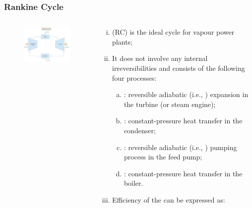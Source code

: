 \documentclass[10pt,compress,handout,unknownkeysallowed]{beamer}
\begin{document}
\begin{frame}
 \frametitle{Rankine Cycle}
 \begin{columns}
   \begin{column}[c]{0.5\linewidth}
    \begin{figure}%
     \begin{center} 
      \includegraphics[width=6.5cm,clip]{../Pics/Simple_Rankine_Cycle}
     \end{center}
    \end{figure}  
   \end{column}
   \begin{column}[l]{0.5\linewidth}
    \begin{enumerate}[i)]\scriptsize
     \item<1-> (RC) is the ideal cycle for vapour power plants;
     \item<2-> It does not involve any internal irreversibilities and consists of the following four processes:
     \begin{enumerate}[a)]\scriptsize
      \item<3-> : reversible adiabatic (i.e., ) expansion in the turbine (or steam engine);
      \item<4-> : constant-pressure heat transfer in the condenser;
      \item<5-> : reversible adiabatic (i.e., ) pumping process in the feed pump;
      \item<6-> : constant-pressure heat transfer in the boiler.  
     \end{enumerate}
     \item<7-> Efficiency of the  can be expressed as:
    \end{enumerate}
   \end{column}
  \end{columns}
 \normalsize
\end{frame}
\end{document}
